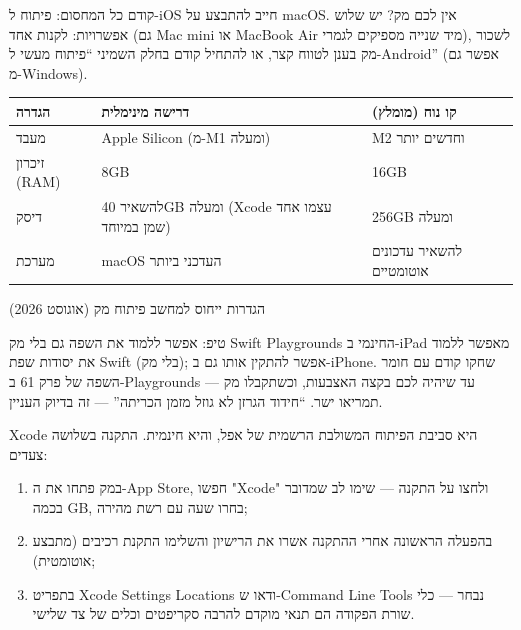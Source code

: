 


קודם כל המחסום: פיתוח ל-iOS חייב להתבצע על macOS. אין לכם מק? יש שלוש אפשרויות: לקנות אחד (גם Mac mini או MacBook Air מיד שנייה מספיקים לגמרי), לשכור מק בענן לטווח קצר, או להתחיל קודם בחלק השמיני “פיתוח מעשי ל-Android” (אפשר גם מ-Windows).

\begin{center}
\begin{tabularx}{\linewidth}{|X|X|X|}
\hline
\textbf{הגדרה} & \textbf{דרישה מינימלית} & \textbf{קו נוח (מומלץ)} \tabularnewline
\hline
מעבד & Apple Silicon (מ-M1 ומעלה) & M2 וחדשים יותר \tabularnewline
זיכרון (RAM) & 8GB & 16GB \tabularnewline
דיסק & להשאיר 40GB ומעלה (Xcode עצמו אחד שמן במיוחד) & 256GB ומעלה \tabularnewline
מערכת & macOS העדכני ביותר & להשאיר עדכונים אוטומטיים \tabularnewline
\hline
\end{tabularx}
\end{center}

\begin{center}\small\color{gray}הגדרות ייחוס למחשב פיתוח מק (אוגוסט 2026)\end{center}

\begin{tcbinfo}{טיפ: אפשר ללמוד את השפה גם בלי מק}
Swift Playgrounds החינמי ב-iPad מאפשר ללמוד את יסודות שפת Swift (בלי מק); אפשר להתקין אותו גם ב-iPhone. שחקו קודם עם חומר השפה של פרק 61 ב-Playgrounds עד שיהיה לכם בקצה האצבעות, וכשתקבלו מק — תמריאו ישר. “חידוד הגרזן לא גוזל מזמן הכריתה” — זה בדיוק העניין.

\end{tcbinfo}


Xcode היא סביבת הפיתוח המשולבת הרשמית של אפל, והיא חינמית. התקנה בשלושה צעדים:

\begin{enumerate}
  \item במק פתחו את ה-App Store, חפשו "Xcode" ולחצו על התקנה — שימו לב שמדובר בכמה GB, בחרו שעה עם רשת מהירה;
  \item בהפעלה הראשונה אחרי ההתקנה אשרו את הרישיון והשלימו התקנת רכיבים (מתבצע אוטומטית);
  \item בתפריט Xcode Settings Locations ודאו ש-Command Line Tools נבחר — כלי שורת הפקודה הם תנאי מוקדם להרבה סקריפטים וכלים של צד שלישי.
\end{enumerate}

